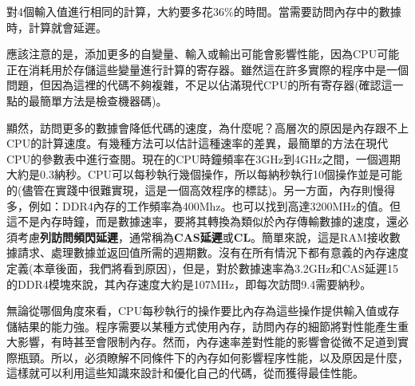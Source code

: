 對4個輸入值進行相同的計算，大約要多花36\%的時間。當需要訪問內存中的數據時，計算就會延遲。

應該注意的是，添加更多的自變量、輸入或輸出可能會影響性能，因為CPU可能正在消耗用於存儲這些變量進行計算的寄存器。雖然這在許多實際的程序中是一個問題，但因為這裡的代碼不夠複雜，不足以佔滿現代CPU的所有寄存器(確認這一點的最簡單方法是檢查機器碼)。

顯然，訪問更多的數據會降低代碼的速度，為什麼呢？高層次的原因是內存跟不上CPU的計算速度。有幾種方法可以估計這種速率的差異，最簡單的方法在現代CPU的參數表中進行查閱。現在的CPU時鐘頻率在3GHz到4GHz之間，一個週期大約是0.3納秒。CPU可以每秒執行幾個操作，所以每納秒執行10個操作並是可能的(儘管在實踐中很難實現，這是一個高效程序的標誌)。另一方面，內存則慢得多，例如：DDR4內存的工作頻率為400Mhz。也可以找到高達3200MHz的值。但這不是內存時鐘，而是數據速率，要將其轉換為類似於內存傳輸數據的速度，還必須考慮\textbf{列訪問頻閃延遲}，通常稱為\textbf{CAS延遲}或\textbf{CL}。簡單來說，這是RAM接收數據請求、處理數據並返回值所需的週期數。沒有在所有情況下都有意義的內存速度定義(本章後面，我們將看到原因)，但是，對於數據速率為3.2GHz和CAS延遲15的DDR4模塊來說，其內存速度大約是107MHz，即每次訪問9.4需要納秒。

無論從哪個角度來看，CPU每秒執行的操作要比內存為這些操作提供輸入值或存儲結果的能力強。程序需要以某種方式使用內存，訪問內存的細節將對性能產生重大影響，有時甚至會限制內存。然而，內存速率差對性能的影響會從微不足道到實際瓶頸。所以，必須瞭解不同條件下的內存如何影響程序性能，以及原因是什麼，這樣就可以利用這些知識來設計和優化自己的代碼，從而獲得最佳性能。








